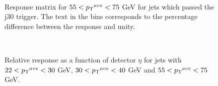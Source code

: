 \begin{figure}
\centering
\mbox{
}
\caption[The response matrix for jets with $55<\ptave{}<75$ GeV]{
Response matrix for $55<\ptave{}<75$ GeV for jets which passed the j30 trigger. 
The text in the bins corresponds to the percentage difference between the response and unity.
\label{JetPerf:ResponseMatrix_55_75_j30}}
\end{figure}


\begin{figure}
\centering
\mbox{
}
\caption[Relative response as a function of $\eta$]{
Relative response as a function of detector $\eta$ for jets with $22<\mbox{$\mbox{$p_{\rm T}$}{}^{ave}$}{}<30$ GeV, $30<\mbox{$\mbox{$p_{\rm T}$}{}^{ave}$}{}<40$ GeV and $55<\ptave{}<75$ GeV.
\label{JetPerf:PtComp}}
\end{figure}


